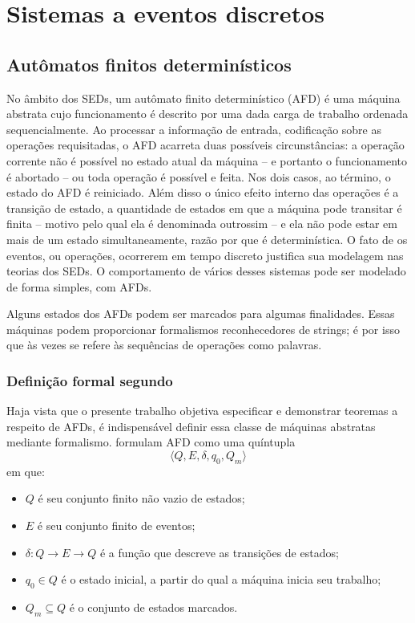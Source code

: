 \chapter{Sistemas a eventos discretos}
\label{cap:seds}

\section{Autômatos finitos determinísticos}

No âmbito dos SEDs, um autômato finito determinístico (AFD) é uma máquina abstrata cujo funcionamento é descrito por uma dada carga de trabalho ordenada sequencialmente. Ao processar a informação de entrada, codificação sobre as operações requisitadas, o AFD acarreta duas possíveis circunstâncias: a operação corrente não é possível no estado atual da máquina -- e portanto o funcionamento é abortado -- ou toda operação é possível e feita. Nos dois casos, ao término, o estado do AFD é reiniciado. Além disso o único efeito interno das operações é a transição de estado, a quantidade de estados em que a máquina pode transitar é finita -- motivo pelo qual ela é denominada outrossim -- e ela não pode estar em mais de um estado simultaneamente, razão por que é determinística. O fato de os eventos, ou operações, ocorrerem em tempo discreto justifica sua modelagem nas teorias dos SEDs. O comportamento de vários desses sistemas pode ser modelado de forma simples, com AFDs.

Alguns estados dos AFDs podem ser marcados para algumas finalidades. Essas máquinas podem proporcionar formalismos reconhecedores de strings; é por isso que às vezes se refere às sequências de operações como palavras.

\subsection{Definição formal segundo }

Haja vista que o presente trabalho objetiva especificar e demonstrar teoremas a respeito de AFDs, é indispensável definir essa classe de máquinas abstratas mediante formalismo.  formulam AFD como uma quíntupla $$\langle Q, E, \delta, q_0, Q_m \rangle$$ em que: \begin{itemize}
    \item $Q$ é seu conjunto finito não vazio de estados;
    \item $E$ é seu conjunto finito de eventos;
    \item $\delta : Q \to E \to Q$ é a função que descreve as transições de estados;
    \item $q_0 \in Q$ é o estado inicial, a partir do qual a máquina inicia seu trabalho;
    \item $Q_m \subseteq Q$ é o conjunto de estados marcados.
\end{itemize}

